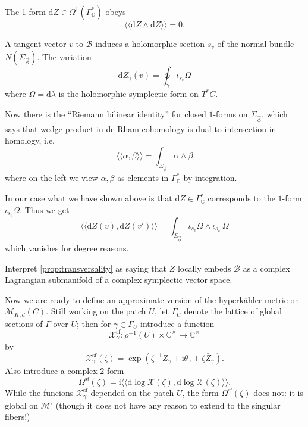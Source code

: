 \documentclass[12pt,letterpaper,reqno]{article}
\numberwithin{equation}{section}
\newcommand{\cB}{\ensuremath{\mathcal B}}
\newcommand{\cM}{\ensuremath{\mathcal M}}
\newcommand{\cX}{\ensuremath{\mathcal X}}
\newcommand{\C}{\ensuremath{\mathbb C}}
\newcommand{\hk}{hyperk\"ahler\xspace}
\newcommand{\I}{{\mathrm i}}
\newcommand{\de}{\mathrm{d}}
\renewcommand{\sf}{\mathrm{sf}}
\newcommand{\DIP}[1]{\langle\!\langle#1\rangle\!\rangle}
\begin{document}
\begin{prop} \label{prop:transversality}
The 1-form $\de Z \in \Omega^1(\Gamma^*_\C)$ obeys
\begin{equation}
  \DIP{\de Z \wedge \de Z} = 0.
\end{equation}
\end{prop}

\begin{pf} A tangent vector $v$ to $\cB$
induces a holomorphic section $s_v$ of the 
normal bundle $N(\Sigma_{\vec \phi})$. The variation
$$\de Z_\gamma(v) = \oint_\gamma \iota_{s_v} \Omega$$
where $\Omega = \de \lambda$ is the holomorphic symplectic
form on $T^* C$.

Now there is the ``Riemann bilinear identity'' for closed $1$-forms 
on $\Sigma_{\vec \phi}$, which says that wedge product in de Rham cohomology 
is dual to intersection in homology, i.e.
$$ \DIP{\alpha,\beta} = \int_{\Sigma_{\vec\phi}} \alpha \wedge \beta
$$
where on the left we view $\alpha, \beta$ as elements 
in $\Gamma^*_\C$ by integration.

In our case what we have shown above is that $\de Z \in \Gamma^*_\C$ corresponds
to the $1$-form $\iota_{s_v}\Omega$.
Thus we get
$$ \DIP{\de Z(v), \de Z(v')} = \int_{\Sigma_{\vec\phi}} \iota_{s_v} \Omega \wedge \iota_{s_{v'}} \Omega$$
which vanishes for degree reasons.
\end{pf}

\begin{exercise} Interpret \autoref{prop:transversality}
as saying that $Z$ locally embeds $\cB$ as a complex Lagrangian submanifold
of a complex symplectic vector space.
\end{exercise}

Now we are ready to define an approximate version of the \hk 
metric on $\cM_{K,d}(C)$. Still working on the patch $U$, 
let $\Gamma_U$ denote the lattice of global sections of $\Gamma$
over $U$; then for $\gamma \in \Gamma_U$ introduce a function
\begin{equation}
	\cX_\gamma^\sf: \rho^{-1}(U) \times \C^\times \to \C^\times
\end{equation}
by
\begin{equation} \label{eq:X-sf}
	\cX_\gamma^\sf(\zeta) = \exp \left(\zeta^{-1} Z_\gamma + \I \theta_\gamma + \zeta \bar{Z}_\gamma \right).
\end{equation}
Also introduce a complex $2$-form
\begin{equation} \label{eq:omegazeta-sf}
	  \Omega^\sf(\zeta) = \I \DIP{\de \log \cX(\zeta), \de \log \cX(\zeta)}.
\end{equation}
While the funcions $\cX_\gamma^\sf$ depended on the patch $U$,
the form $\Omega^\sf(\zeta)$ does not: it is global on $\cM'$
(though it does not have any reason to extend to the singular fibers!)
\end{document}
